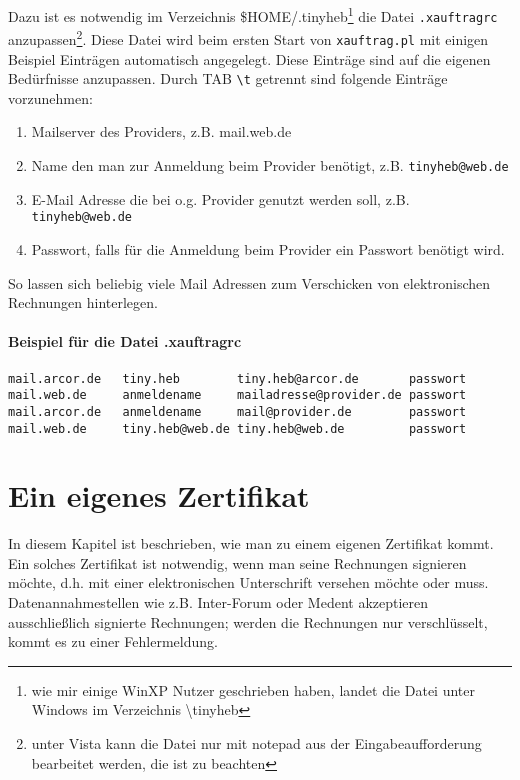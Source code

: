 Dazu ist es notwendig im Verzeichnis \$HOME/.tinyheb\footnote{wie mir einige WinXP Nutzer geschrieben haben, landet die Datei unter Windows im Verzeichnis \textbackslash tinyheb} die Datei
\verb|.xauftragrc| anzupassen\footnote{unter Vista kann die Datei nur mit
notepad aus der Eingabeaufforderung bearbeitet werden, die ist zu beachten}. 
Diese Datei wird beim ersten Start von 
\verb|xauftrag.pl| mit einigen Beispiel Einträgen automatisch angegelegt.
Diese Einträge sind auf die eigenen Bedürfnisse anzupassen.
Durch TAB \verb|\t| getrennt sind folgende Einträge vorzunehmen:
\begin{enumerate}
\item
Mailserver des Providers, z.B. mail.web.de
\item
Name den man zur Anmeldung beim Provider benötigt, z.B. 
\nolinkurl{tinyheb@web.de}
\item
E-Mail Adresse die bei o.g. Provider genutzt werden soll, z.B.
\nolinkurl{tinyheb@web.de}
\item
Passwort, falls für die Anmeldung beim Provider ein Passwort benötigt wird.
\end{enumerate}
So lassen sich beliebig viele Mail Adressen zum Verschicken von elektronischen
Rechnungen hinterlegen.

\paragraph{Beispiel für die Datei .xauftragrc}
\begin{verbatim}
mail.arcor.de   tiny.heb        tiny.heb@arcor.de       passwort
mail.web.de     anmeldename     mailadresse@provider.de passwort
mail.arcor.de   anmeldename     mail@provider.de        passwort
mail.web.de     tiny.heb@web.de tiny.heb@web.de         passwort
\end{verbatim}


\section{Ein eigenes Zertifikat\label{anhang:eigenes_cert}}
In diesem Kapitel ist beschrieben, wie man zu einem eigenen Zertifikat
kommt. Ein solches Zertifikat ist notwendig, wenn man seine Rechnungen
signieren möchte, d.h. mit einer elektronischen Unterschrift versehen
möchte oder muss. Datenannahmestellen wie z.B. Inter-Forum oder Medent
akzeptieren ausschließlich signierte Rechnungen; werden die Rechnungen
nur verschlüsselt, kommt es zu einer Fehlermeldung.

